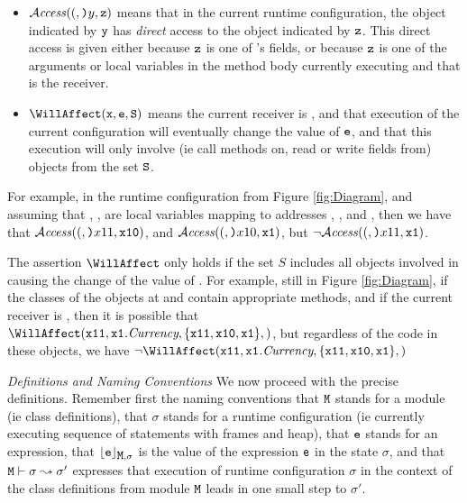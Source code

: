 \documentclass[acmsmall,screen]{acmart}
\begin{document}
\begin{itemize}
\item
${\mathcal{A}}\textrm{\textit{ccess}}((,{\mbox{\tt{)}}}{y},{\mbox{\tt{z}}})$  means that in the current runtime configuration, the object indicated by ${\mbox{\tt{y}}}$ has {\em direct} access to the object
indicated by  ${\mbox{\tt{z}}}$. This direct access is given either because ${\mbox{\tt{z}}}$ is one of 's fields, or because ${\mbox{\tt{z}}}$
is one of the arguments or local variables in the method body currently executing and that  is the receiver.
\item
$\WillAffect(\prg{x},\syntax{\sE},\prg{S})$
means the current receiver is , and that 
execution of the current configuration will eventually change the value of ${\mbox{\tt{{\it {{\mbox{\tt{e}}}}}}}}$, and that this execution  
will only involve (ie call methods on, read or write fields from) objects from the set ${\mbox{\tt{S}}}$.
\end{itemize}

For example, in the runtime configuration from Figure \ref{fig:Diagram}, and assuming that
, ,  are local variables mapping to addresses , , and , then  we   have that 
${\mathcal{A}}\textrm{\textit{ccess}}((,{\mbox{\tt{)}}}{x11},{\mbox{\tt{x10}}})$, and ${\mathcal{A}}\textrm{\textit{ccess}}((,{\mbox{\tt{)}}}{x10},{\mbox{\tt{x1}}})$, but $\neg {\mathcal{A}}\textrm{\textit{ccess}}((,{\mbox{\tt{)}}}{x11},{\mbox{\tt{x1}}})$.


The assertion $\WillAffect$  only holds if the set $S$ includes all objects involved in causing the
change of the value of . For example, still in Figure \ref{fig:Diagram}, if the classes of the 
objects at   and  contain appropriate methods,  and if the current receiver is , then 
it is possible that $\WillAffect(\prg{x11}, \syntax{\prg{x1}.Currency},\{\prg{x11},\prg{x10},\prg{x1}\}, )$,  but regardless of the code in these
objects, we have $\neg \WillAffect(\prg{x11}, \syntax{\prg{x1}.Currency},\{\prg{x11},\prg{x10},\prg{x1}\}, )$


\vspace{.2cm}
 
\noindent
{\em {Definitions and Naming Conventions}} We now proceed with the precise definitions.  Remember first the
naming conventions that  ${\mbox{\tt{M}}}$ stands for a module (ie class definitions), that
$\sigma$ stands for a runtime configuration (ie currently executing sequence of statements with frames and  heap),
  that ${{\mbox{\tt{e}}}}$ stands for an expression, that ${\lfloor{ {{\mbox{\tt{{{\mbox{\tt{e}}}}}}} }}\rfloor_{{\mbox{\tt{M}}},\sigma}}$
is the value of the
expression ${{\mbox{\tt{e}}}}$ in the state $\sigma$, and  that ${\mbox{\tt{M}}}\vdash \sigma  \leadsto   \sigma'$ expresses that execution of runtime 
configuration $\sigma$   in the context of the class definitions from module ${\mbox{\tt{M}}}$ leads in one small step to $\sigma'$.
\end{document}
